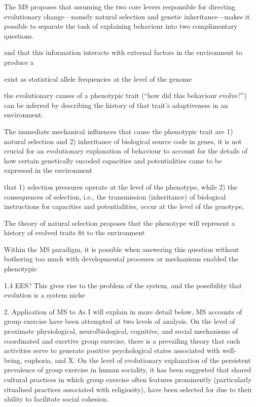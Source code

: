 The MS proposes that assuming the two core levers responsible for directing evolutionary change---namely natural selection and genetic inheritance---makes it possible to separate the task of explaining behaviour into two complimentary questions.


and that this information interacts with external factors in the environment to produce a


exist as statistical allele frequencies at the level of the genome


the evolutionary causes of a phenotypic trait (``how did this behaviour evolve?'') can be inferred by describing the history of that trait's adaptiveness in an environment.

The immediate mechanical influences that cause the phenotypic trait are 1) natural selection and 2) inheritance of biological source code in genes, it is not crucial for an evolutionary explanation of behaviour to account for the details of how certain genetically encoded capacities and potentialities came to be expressed in the environment

 that 1) selection pressures operate at the level of the phenotype, while 2) the consequences of selection, i.e., the transmission (inheritance) of biological instructions for capacities and potentialities, occur at the level of the genotype,

The theory of natural selection proposes that the phenotype will represent a history of evolved traits fit to the environment

Within the MS paradigm, it is possible when answering this question without bothering too much with developmental processes or mechanisms enabled the phenotypic



1.4  EES?
This gives rise to the problem of the system, and the possibility that evolution is a system niche


2. Application of MS to
As I will explain in more detail below, MS accounts of group exercise have been attempted at two levels of analysis.  On the level of proximate physiological, neurolbiological, cognitive, and social mechanisms of coordinated and exertive group exercise, there is a prevailing theory that such activities serve to generate positive psychological states associated with well-being, euphoria, and X. On the level of evolutionary explanation of the persistent prevalence of group exercise in human sociality, it has been suggested that shared cultural practices in which group exercise often features prominently (particularly ritualised practices associated with religiosity), have been selected for  due to their ability to facilitate social cohesion.

